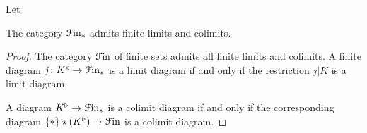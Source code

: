 \documentclass[main.tex]{subfiles}
\begin{document}
\begin{definition}
\begin{itemize}
  \end{itemize}
\end{definition}

\begin{lemma}
  Let
\end{lemma}

\begin{lemma}
  The category $\mathcal{F}\mathrm{in}_{*}$ admits finite limits and colimits.
\end{lemma}
\begin{proof}
  The category $\mathcal{F}\mathrm{in}$ of finite sets admits all finite limits and colimits. A finite diagram $j\colon K^{\triangleleft} \to \mathcal{F}\mathrm{in}_{*}$ is a limit diagram if and only if the restriction $j|K$ is a limit diagram.

  A diagram $K^{\triangleright} \to \mathcal{F}\mathrm{in}_{*}$ is a colimit diagram if and only if the corresponding diagram $\{\ast\} \star (K^{\triangleright}) \to \mathcal{F}\mathrm{in}$ is a colimit diagram.
\end{proof}
\end{document}
